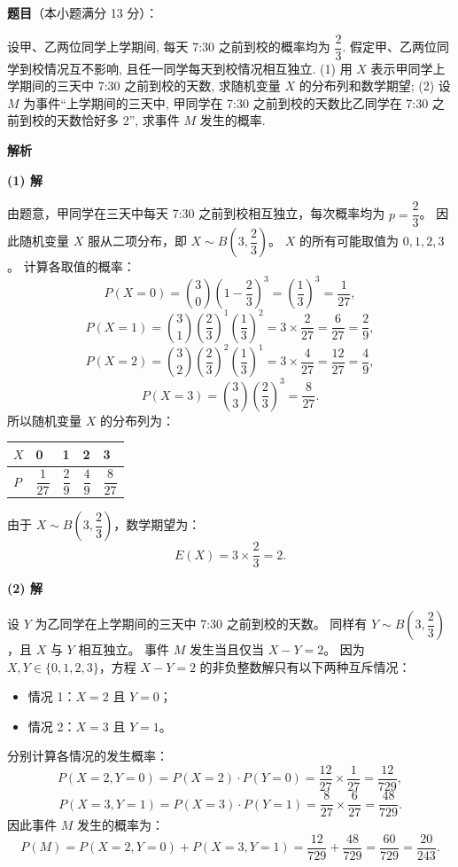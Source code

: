 \begin{answer}

\textbf{题目}（本小题满分 13 分）：

设甲、乙两位同学上学期间, 每天 7:30 之前到校的概率均为 $\dfrac{2}{3}$. 假定甲、乙两位同学到校情况互不影响, 且任一同学每天到校情况相互独立.
(1) 用 $X$ 表示甲同学上学期间的三天中 7:30 之前到校的天数, 求随机变量 $X$ 的分布列和数学期望;
(2) 设 $M$ 为事件“上学期间的三天中, 甲同学在 7:30 之前到校的天数比乙同学在 7:30 之前到校的天数恰好多 2”, 求事件 $M$ 发生的概率.

\textbf{解析}

\textbf{(1) 解}

由题意，甲同学在三天中每天 7:30 之前到校相互独立，每次概率均为 $p = \dfrac{2}{3}$。
因此随机变量 $X$ 服从二项分布，即 $X \sim B\left(3, \dfrac{2}{3}\right)$。
$X$ 的所有可能取值为 $0, 1, 2, 3$。
计算各取值的概率：
\nopagebreak[4]
\[P(X = 0) = \binom{3}{0} \left(1 - \frac{2}{3}\right)^3 = \left(\frac{1}{3}\right)^3 = \frac{1}{27},\]
\nopagebreak[4]
\[P(X = 1) = \binom{3}{1} \left(\frac{2}{3}\right)^1 \left(\frac{1}{3}\right)^2 = 3 \times \frac{2}{27} = \frac{6}{27} = \frac{2}{9},\]
\nopagebreak[4]
\[P(X = 2) = \binom{3}{2} \left(\frac{2}{3}\right)^2 \left(\frac{1}{3}\right)^1 = 3 \times \frac{4}{27} = \frac{12}{27} = \frac{4}{9},\]
\nopagebreak[4]
\[P(X = 3) = \binom{3}{3} \left(\frac{2}{3}\right)^3 = \frac{8}{27}.\]
所以随机变量 $X$ 的分布列为：

\begin{center}
\begin{tabular}{lllll}
\toprule
$X$ & 0 & 1 & 2 & 3 \\
\midrule
$P$ & $\dfrac{1}{27}$ & $\dfrac{2}{9}$ & $\dfrac{4}{9}$ & $\dfrac{8}{27}$ \\
\bottomrule
\end{tabular}
\end{center}

由于 $X \sim B\left(3, \dfrac{2}{3}\right)$，数学期望为：
\nopagebreak[4]
\[E(X) = 3 \times \frac{2}{3} = 2.\]

\textbf{(2) 解}

设 $Y$ 为乙同学在上学期间的三天中 7:30 之前到校的天数。
同样有 $Y \sim B\left(3, \dfrac{2}{3}\right)$，且 $X$ 与 $Y$ 相互独立。
事件 $M$ 发生当且仅当 $X - Y = 2$。
因为 $X, Y \in \{0, 1, 2, 3\}$，方程 $X - Y = 2$ 的非负整数解只有以下两种互斥情况：
\begin{itemize}
\item 情况 1：$X = 2$ 且 $Y = 0$；
\item 情况 2：$X = 3$ 且 $Y = 1$。
\end{itemize}
分别计算各情况的发生概率：
\nopagebreak[4]
\[P(X = 2, Y = 0) = P(X = 2) \cdot P(Y = 0) = \frac{12}{27} \times \frac{1}{27} = \frac{12}{729},\]
\nopagebreak[4]
\[P(X = 3, Y = 1) = P(X = 3) \cdot P(Y = 1) = \frac{8}{27} \times \frac{6}{27} = \frac{48}{729}.\]
因此事件 $M$ 发生的概率为：
\nopagebreak[4]
\[P(M) = P(X = 2, Y = 0) + P(X = 3, Y = 1) = \frac{12}{729} + \frac{48}{729} = \frac{60}{729} = \frac{20}{243}.\]


\end{answer}

